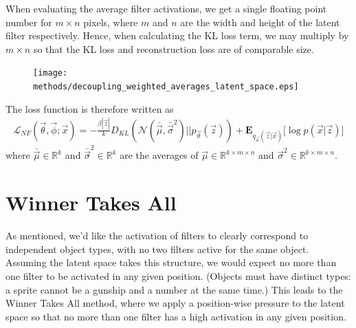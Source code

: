 When evaluating the average filter activations, we get a single floating point number for $m \times n$ pixels, where $m$ and $n$ are the width and height of the latent filter respectively. Hence, when calculating the KL loss term, we may multiply by $m \times n$ so that the KL loss and reconstruction loss are of comparable size.\\

\begin{figure}[H]
\centering
\captionsetup{justification=centering}
\texttt{[image: methods/decoupling\_weighted\_averages\_latent\_space.eps]}
\label{fig:decoupling_weighted_averages_latent_space}
\end{figure}

The loss function is therefore written as 
\begin{align}
\mathcal{L}_{NF}(\vec{\theta}, \vec{\phi}; \vec{x}) = -\frac{\beta |\vec{z}|}{k} D_{KL}(\mathcal{N}(\bar{\vec{\mu}}, \bar{\vec{\sigma}}^2) || p_{\vec{\theta}}(\vec{z})) + \mathbf{E}_{q_{\vec{\phi}}(\vec{z}|\vec{x})}\big[\log p(\vec{x} | \vec{z}) \big]
\end{align}
where $\bar{\vec{\mu}} \in \mathbb{R}^{k}$ and $\bar{\vec{\sigma}}^2 \in \mathbb{R}^{k}$ are the averages of $\vec{\mu} \in \mathbb{R}^{k\times m\times n}$ and $\vec{\sigma}^2\in \mathbb{R}^{k\times m\times n}$.



%
%
%
%
%
\section{Winner Takes All}
As mentioned, we'd like the activation of filters to clearly correspond to independent object types, with no two filters active for the same object. Assuming the latent space takes this structure, we would expect no more than one filter to be activated in any given position. (Objects must have distinct types: a sprite cannot be a gunship and a number at the same time.) This leads to the Winner Takes All method, where we apply a position-wise pressure to the latent space so that no more than one filter has a high activation in any given position.

